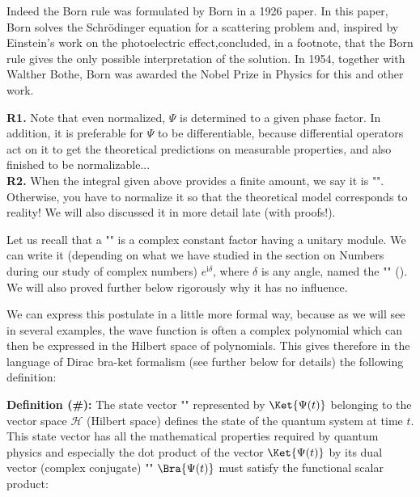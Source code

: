 	Indeed the Born rule was formulated by Born in a 1926 paper. In this paper, Born solves the Schrödinger equation for a scattering problem and, inspired by Einstein's work on the photoelectric effect,concluded, in a footnote, that the Born rule gives the only possible interpretation of the solution. In 1954, together with Walther Bothe, Born was awarded the Nobel Prize in Physics for this and other work.
	\begin{tcolorbox}[title=Remarks,colframe=black,arc=10pt]
	\textbf{R1.} Note that even normalized, $\Psi$ is determined to a given phase factor. In addition, it is preferable for $\Psi$ to be differentiable, because differential operators act on it to get the theoretical predictions on measurable properties, and also finished to be normalizable...\\
	
	\textbf{R2.} When the integral given above provides a finite amount, we say it is "". Otherwise, you have to normalize it so that the theoretical model corresponds to reality! We will also discussed it in more detail late (with proofs!). 
	\end{tcolorbox}
	
	Let us recall that a "" is a complex constant factor having a unitary module. We can write it (depending on what we have studied in the section on Numbers during our study of complex numbers) $e^{\mathrm{i}\delta}$, where $\delta$ is any angle, named the "" (). We will also proved further below rigorously why it has no influence.
	
	We can express this postulate in a little more formal way, because as we will see in several examples, the wave function is often a complex polynomial which can then be expressed in the Hilbert space of polynomials. This gives therefore in the language of Dirac bra-ket formalism (see further below for details) the following definition:
	
	\textbf{Definition (\#\mydef):} The state vector "" represented by $\Ket{\Psi(t)}$ belonging to the vector space $\mathcal{H}$ (Hilbert space) defines the state of the quantum system at time $t$. This state vector has all the mathematical properties required by quantum physics and especially the dot product of the vector $\Ket{\Psi(t)}$ by its dual vector (complex conjugate) "" $\Bra{\Psi(t)}$ must satisfy the functional scalar product:
	
